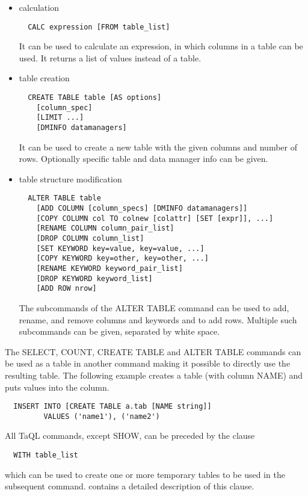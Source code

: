 \begin{itemize}
\item calculation
\begin{verbatim}
  CALC expression [FROM table_list]
\end{verbatim}
It can be used to calculate an expression, in which columns
in a table can be used. It returns a list of values instead of a table.

\item table creation
\begin{verbatim}
  CREATE TABLE table [AS options]
    [column_spec]
    [LIMIT ...]
    [DMINFO datamanagers]
\end{verbatim}
It can be used to create a new table with the given columns and number
of rows.
Optionally specific table and data manager info can be given.

\item table structure modification
\begin{verbatim}
  ALTER TABLE table
    [ADD COLUMN [column_specs] [DMINFO datamanagers]]
    [COPY COLUMN col TO colnew [colattr] [SET [expr]], ...]
    [RENAME COLUMN column_pair_list]
    [DROP COLUMN column_list]
    [SET KEYWORD key=value, key=value, ...]
    [COPY KEYWORD key=other, key=other, ...]
    [RENAME KEYWORD keyword_pair_list]
    [DROP KEYWORD keyword_list]
    [ADD ROW nrow]
\end{verbatim}
The subcommands of the ALTER TABLE command can be used
to add, rename, and remove columns and keywords and to add rows.
Multiple such subcommands can be given, separated by white space.

\end{itemize}
The SELECT, COUNT, CREATE TABLE and ALTER TABLE commands can be used
as a table in another command making it possible to directly use the
resulting table. The following example creates a table (with column
NAME) and puts values into the column.
\begin{verbatim}
  INSERT INTO [CREATE TABLE a.tab [NAME string]]
         VALUES ('name1'), ('name2')
\end{verbatim}
All TaQL commands, except SHOW, can be preceded by the clause
\begin{verbatim}
  WITH table_list
\end{verbatim}
which can be used to create one or more temporary tables to be used in
the subsequent command. 
contains a detailed description of this clause.
